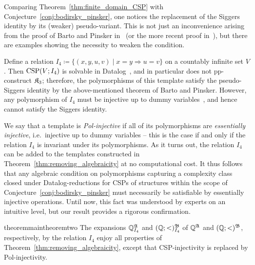  Comparing Theorem~\ref{thm:finite_domain_CSP} with Conjecture~\ref{conj:bodirsky_pinsker}, one notices the replacement of the Siggers identity by its (weaker) pseudo-variant. This is not just an inconvenience arising from the proof of Barto and Pinsker in~\cite{barto_pinsker_journal} (or the more recent proof in~\cite{BBKMP23}), but there are examples showing the necessity to weaken the condition. 
\begin{example} \label{ex:example_I4}
    Define a relation $I_4 \coloneqq \{ (x,y,u,v) \mid x=y \Rightarrow u=v\}$ on a countably infinite set $V$. Then $\mathrm{CSP}(V;I_4)$ is solvable in Datalog~\cite{bodirsky2010datalog}, and in particular does not pp-construct $\mathfrak{K}_3$; therefore, the polymorphisms of this template satisfy the pseudo-Siggers identity by the above-mentioned theorem of Barto and Pinsker. However, any polymorphism of $I_4$ must be injective up to dummy variables~\cite{BodChenPinsker}, and hence cannot satisfy the Siggers identity.
\end{example}

 We say that a template is \emph{Pol-injective} if all of its polymorphisms are \emph{essentially injective}, i.e.~injective up to dummy variables -- this is the case if and only if the relation $I_4$ is invariant under its polymorphisms.  
 As it turns out, the relation $I_4$ can be added to the templates constructed in Theorem~\ref{thm:removing_algebraicity} at no computational cost. It thus follows that any algebraic condition on polymorphisms capturing a complexity class closed under Datalog-reductions for CSPs of structures within the scope of Conjecture~\ref{conj:bodirsky_pinsker} must necessarily be satisfiable by essentially injective operations.
% 
Until now, this fact was understood by experts on an intuitive level, but our result provides a rigorous confirmation.
 


\begin{restatable}{theorem}{maintheoremtwo}    \label{thm:polinjective}
The expansions $\mathbb{Q}^{\mathfrak{A}}_{I_4}$ and $(\mathbb{Q};<)^{\mathfrak{B}}_{I_4}$ of $\mathbb{Q}^{\mathfrak{A}}$ and $(\mathbb{Q};<)^{\mathfrak{B}}$, respectively, by the relation $I_4$ enjoy all properties of Theorem~\ref{thm:removing_algebraicity}, 
except that CSP-injectivity is replaced by Pol-injectivity.
 \end{restatable} 

